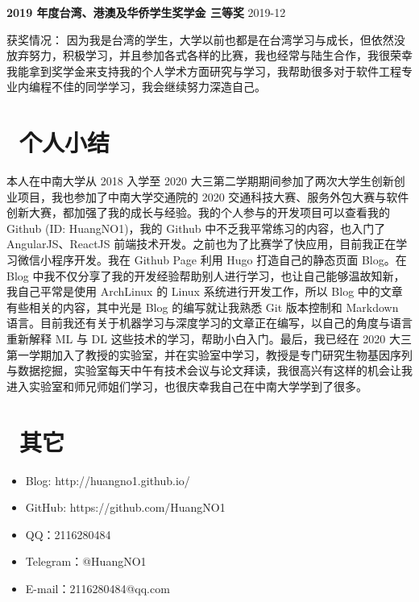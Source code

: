\documentclass[12pt, a4paper]{article}
\begin{document}
\textbf{2019 年度台湾、港澳及华侨学生奖学金 \quad 三等奖} \hfill 2019-12

获奖情况： \quad 因为我是台湾的学生，大学以前也都是在台湾学习与成长，但依然没放弃努力，积极学习，并且参加各式各样的比赛，我也经常与陆生合作，我很荣幸我能拿到奖学金来支持我的个人学术方面研究与学习，我帮助很多对于软件工程专业内编程不佳的同学学习，我会继续努力深造自己。

\section{\color{CVBlue}\faAtlassian\ 个人小结}

本人在中南大学从 2018 入学至 2020 大三第二学期期间参加了两次大学生创新创业项目，我也参加了中南大学交通院的 2020 交通科技大赛、服务外包大赛与软件创新大赛，都加强了我的成长与经验。我的个人参与的开发项目可以查看我的 Github (ID: HuangNO1)，我的 Github 中不乏我平常练习的内容，也入门了 AngularJS、ReactJS 前端技术开发。之前也为了比赛学了快应用，目前我正在学习微信小程序开发。我在 Github Page 利用 Hugo 打造自己的静态页面 Blog。在 Blog 中我不仅分享了我的开发经验帮助别人进行学习，也让自己能够温故知新，我自己平常是使用 ArchLinux 的 Linux 系统进行开发工作，所以 Blog 中的文章有些相关的内容，其中光是 Blog 的编写就让我熟悉 Git 版本控制和 Markdown 语言。目前我还有关于机器学习与深度学习的文章正在编写，以自己的角度与语言重新解释 ML 与 DL 这些技术的学习，帮助小白入门。最后，我已经在 2020 大三第一学期加入了教授的实验室，并在实验室中学习，教授是专门研究生物基因序列与数据挖掘，实验室每天中午有技术会议与论文拜读，我很高兴有这样的机会让我进入实验室和师兄师姐们学习，也很庆幸我自己在中南大学学到了很多。 

\section{\color{CVBlue}\faInfo\ 其它}
\begin{itemize}[parsep=0.5ex]
  \item Blog: http://huangno1.github.io/
  \item GitHub: https://github.com/HuangNO1
  \item QQ：2116280484
  \item Telegram：@HuangNO1
  \item E-mail：2116280484@qq.com
\end{itemize}
\end{document}
